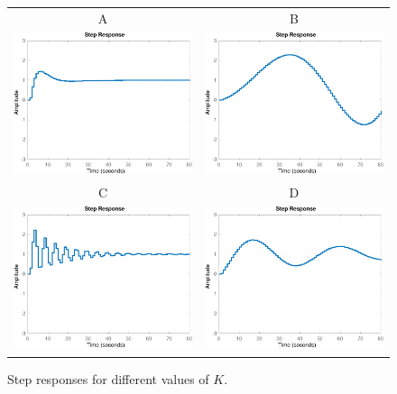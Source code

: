 \documentclass[letter,11pt]{scrartcl}
\begin{document}
\begin{figure}[t]
\begin{center}
\begin{tabular}{cc}
A & B\\
\includegraphics[width=0.4\linewidth]{apollo-step-plot-3-crop}
&\includegraphics[width=0.4\linewidth]{apollo-step-plot-1-crop}\\
C & D\\
\includegraphics[width=0.4\linewidth]{apollo-step-plot-4-crop}
&\includegraphics[width=0.4\linewidth]{apollo-step-plot-2-crop}

\end{tabular}
\caption{Step responses for different values of $K$.}
\label{fig:step}
\end{center}
\end{figure}
\end{document}
